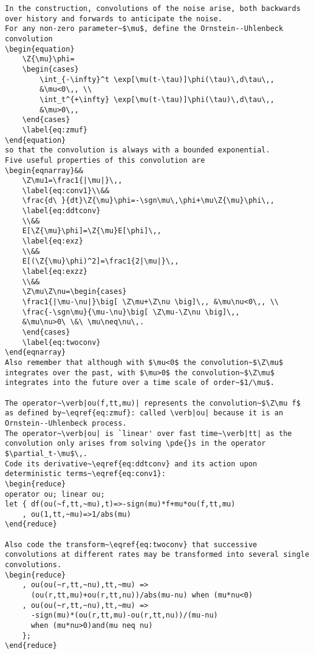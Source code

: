 \documentclass[11pt,a5paper]{article}
\newcommand{\Z}[1]{e^{#1t}{\star}}
\newcommand{\sgn}{\operatorname{sgn}}
\begin{document}
\begin{reduce}
\begin{verbatim}
In the construction, convolutions of the noise arise, both backwards over history and forwards to anticipate the noise.
For any non-zero parameter~$\mu$, define the Ornstein--Uhlenbeck convolution
\begin{equation}
    \Z{\mu}\phi=
    \begin{cases}
        \int_{-\infty}^t \exp[\mu(t-\tau)]\phi(\tau)\,d\tau\,,
        &\mu<0\,, \\
        \int_t^{+\infty} \exp[\mu(t-\tau)]\phi(\tau)\,d\tau\,,
        &\mu>0\,,             
    \end{cases}
    \label{eq:zmuf}
\end{equation}
so that the convolution is always with a bounded exponential.
Five useful properties of this convolution are
\begin{eqnarray}&&
    \Z\mu1=\frac1{|\mu|}\,,
    \label{eq:conv1}\\&&
    \frac{d\ }{dt}\Z{\mu}\phi=-\sgn\mu\,\phi+\mu\Z{\mu}\phi\,,
    \label{eq:ddtconv}
    \\&&
    E[\Z{\mu}\phi]=\Z{\mu}E[\phi]\,,
    \label{eq:exz}
    \\&&
    E[(\Z{\mu}\phi)^2]=\frac1{2|\mu|}\,,
    \label{eq:exzz}
    \\&&
    \Z\mu\Z\nu=\begin{cases}
    \frac1{|\mu-\nu|}\big[ \Z\mu+\Z\nu \big]\,, &\mu\nu<0\,, \\
    \frac{-\sgn\mu}{\mu-\nu}\big[ \Z\mu-\Z\nu \big]\,, 
    &\mu\nu>0\ \&\ \mu\neq\nu\,.
    \end{cases}
    \label{eq:twoconv}
\end{eqnarray}
Also remember that although with $\mu<0$ the convolution~$\Z\mu$
integrates over the past, with $\mu>0$ the convolution~$\Z\mu$ integrates into the future over a time scale of order~$1/\mu$.

The operator~\verb|ou(f,tt,mu)| represents the convolution~$\Z\mu f$ as defined by~\eqref{eq:zmuf}: called \verb|ou| because it is an Ornstein--Uhlenbeck process.
The operator~\verb|ou| is `linear' over fast time~\verb|tt| as the convolution only arises from solving \pde{}s in the operator
$\partial_t-\mu$\,.
Code its derivative~\eqref{eq:ddtconv} and its action upon deterministic terms~\eqref{eq:conv1}:
\begin{reduce}
operator ou; linear ou;
let { df(ou(~f,tt,~mu),t)=>-sign(mu)*f+mu*ou(f,tt,mu)
    , ou(1,tt,~mu)=>1/abs(mu)
\end{reduce}

Also code the transform~\eqref{eq:twoconv} that successive convolutions at different rates may be transformed into several single convolutions.
\begin{reduce}
    , ou(ou(~r,tt,~nu),tt,~mu) => 
      (ou(r,tt,mu)+ou(r,tt,nu))/abs(mu-nu) when (mu*nu<0)
    , ou(ou(~r,tt,~nu),tt,~mu) => 
      -sign(mu)*(ou(r,tt,mu)-ou(r,tt,nu))/(mu-nu)
      when (mu*nu>0)and(mu neq nu)
    };
\end{reduce}


\end{verbatim}
\end{reduce}
\end{document}

